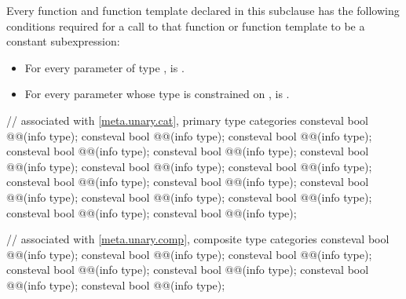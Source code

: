 \pnum
Every function and function template declared in this subclause
has the following conditions
required for a call to that function or function template
to be a constant subexpression:
\begin{itemize}
\item
  For every parameter  of type ,
   is .
\item
  For every parameter 
  whose type is constrained on ,
   is .
\end{itemize}

\begin{codeblock}
// associated with \ref{meta.unary.cat}, primary type categories
consteval bool @@(info type);
consteval bool @@(info type);
consteval bool @@(info type);
consteval bool @@(info type);
consteval bool @@(info type);
consteval bool @@(info type);
consteval bool @@(info type);
consteval bool @@(info type);
consteval bool @@(info type);
consteval bool @@(info type);
consteval bool @@(info type);
consteval bool @@(info type);
consteval bool @@(info type);
consteval bool @@(info type);
consteval bool @@(info type);

// associated with \ref{meta.unary.comp}, composite type categories
consteval bool @@(info type);
consteval bool @@(info type);
consteval bool @@(info type);
consteval bool @@(info type);
consteval bool @@(info type);
consteval bool @@(info type);
consteval bool @@(info type);


\end{codeblock}
